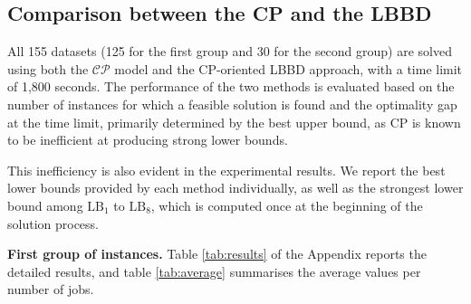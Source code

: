 \documentclass[a4paper,final]{article}
\begin{document}
        

    \subsection{Comparison between the CP and the LBBD}
        All 155 datasets (125 for the first group and 30 for the second group) are solved using both the $\mathcal{CP}$ model and the CP-oriented LBBD approach, with a time limit of 1,800 seconds. The performance of the two methods is evaluated based on the number of instances for which a feasible solution is found and the optimality gap at the time limit, primarily determined by the best upper bound, as CP is known to be inefficient at producing strong lower bounds.
        
        This inefficiency is also evident in the experimental results. We report the best lower bounds provided by each method individually, as well as the strongest lower bound among $\text{LB}_{1}$ to $\text{LB}_{8}$, which is computed once at the beginning of the solution process.
        
        \textbf{First group of instances. }Table \ref{tab:results} of the Appendix reports the detailed results, and table \ref{tab:average} summarises the average values per number of jobs.

        \begin{table}[H]
            \centering
            \caption{Average results per number of jobs}
            \label{tab:average}
        \end{table}
\end{document}
